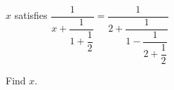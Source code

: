 $x$ satisfies $\dfrac{1}{x+ \dfrac{1}{1+\dfrac{1}{2}}}=\dfrac{1}{2+ \dfrac{1}{1- \dfrac{1}{2+\dfrac{1}{2}}}}$

Find $x$.
